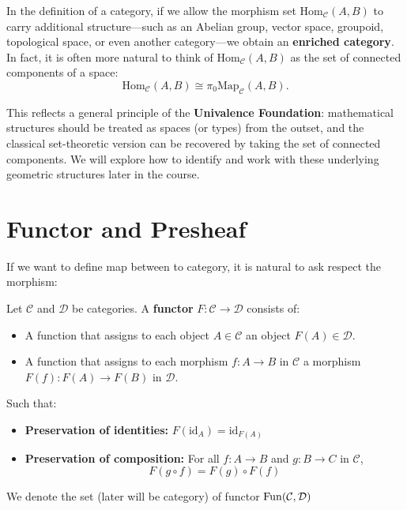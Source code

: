 \begin{remark}
In the definition of a category, if we allow the morphism set $\mathrm{Hom}_{\mathcal{C}}(A, B)$ to carry additional structure—such as an Abelian group, vector space, groupoid, topological space, or even another category—we obtain an \textbf{enriched category}. In fact, it is often more natural to think of $\mathrm{Hom}_{\mathcal{C}}(A, B)$ as the set of connected components of a space:
\[
\mathrm{Hom}_{\mathcal{C}}(A, B) \cong \pi_0 \mathrm{Map}_{\mathcal{C}}(A, B).
\]

This reflects a general principle of the \textbf{Univalence Foundation}: mathematical structures should be treated as spaces (or types) from the outset, and the classical set-theoretic version can be recovered by taking the set of connected components. We will explore how to identify and work with these underlying geometric structures later in the course.
\end{remark} 

\section{Functor and Presheaf}
If we want to define map between to category, it is natural to ask respect the morphism:

\begin{definition}[Functor]
  Let $\mathcal{C}$ and $\mathcal{D}$ be categories. A \textbf{functor} $F: \mathcal{C} \to \mathcal{D}$ consists of:

\begin{itemize}
    \item A function that assigns to each object $A \in \mathcal{C}$ an object $F(A) \in \mathcal{D}$.
    \item A function that assigns to each morphism $f: A \to B$ in $\mathcal{C}$ a morphism $F(f): F(A) \to F(B)$ in $\mathcal{D}$.
\end{itemize}

Such that:
\begin{itemize}
    \item \textbf{Preservation of identities:} $F(\mathrm{id}_A) = \mathrm{id}_{F(A)}$
    \item \textbf{Preservation of composition:} For all $f: A \to B$ and $g: B \to C$ in $\mathcal{C}$,
    \[
    F(g \circ f) = F(g) \circ F(f)
    \]
\end{itemize}
\end{definition}
We denote the set (later will be category) of functor $\mathrm{Fun}(\mathcal{C} , \mathcal{D})$

